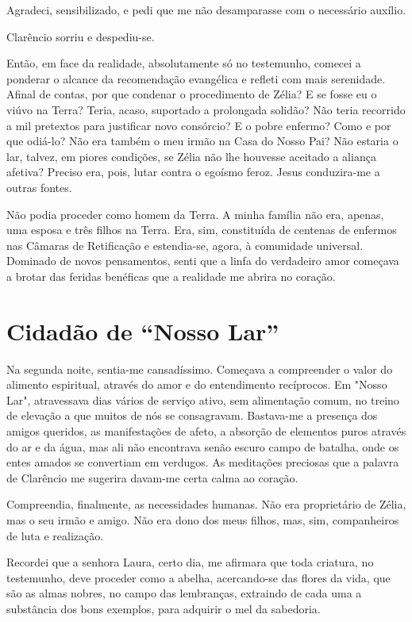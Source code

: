 \documentclass[portuguese,12pt,a4paper]{scrbook}
\begin{document}
	Agradeci, sensibilizado, e pedi que me não desamparasse com o necessário auxílio.
	
	Clarêncio sorriu e despediu-se.
	
	Então, em face da realidade, absolutamente só no testemunho, comecei a ponderar o alcance da recomendação evangélica e refleti com mais serenidade. Afinal de contas, por que condenar o procedimento de Zélia? E se fosse eu o viúvo na Terra? Teria, acaso, suportado a prolongada solidão? Não teria recorrido a mil pretextos para justificar novo consórcio? E o pobre enfermo? Como e por que odiá-lo? Não era também o meu irmão na Casa do Nosso Pai? Não estaria o lar, talvez, em piores condições, se Zélia não lhe houvesse aceitado a aliança afetiva? Preciso era, pois, lutar contra o egoísmo feroz. Jesus conduzira-me a outras fontes.
	
	Não podia proceder como homem da Terra. A minha família não era, apenas, uma esposa e três filhos na Terra. Era, sim, constituída de centenas de enfermos nas Câmaras de Retificação e estendia-se, agora, à comunidade universal. Dominado de novos pensamentos, senti que a linfa do verdadeiro amor começava a brotar das feridas benéficas que a realidade me abrira no coração.
	
	
	\chapter{Cidadão de “Nosso Lar”}
	
	Na segunda noite, sentia-me cansadíssimo. Começava a compreender o valor do alimento espiritual, através do amor e do entendimento recíprocos. Em "Nosso Lar", atravessava dias vários de serviço ativo, sem alimentação comum, no treino de elevação a que muitos de nós se consagravam. Bastava-me a presença dos amigos queridos, as manifestações de afeto, a absorção de elementos puros através do ar e da água, mas ali não encontrava senão escuro campo de batalha, onde os entes amados se convertiam em verdugos. As meditações preciosas que a palavra de Clarêncio me sugerira davam-me certa calma ao coração.
	
	Compreendia, finalmente, as necessidades humanas. Não era proprietário de Zélia, mas o seu irmão e amigo. Não era dono dos meus filhos, mas, sim, companheiros de luta e realização.
	
	Recordei que a senhora Laura, certo dia, me afirmara que toda criatura, no testemunho, deve proceder como a abelha, acercando-se das flores da vida, que são as almas nobres, no campo das lembranças, extraindo de cada uma a substância dos bons exemplos, para adquirir o mel da sabedoria.
	
\end{document}
